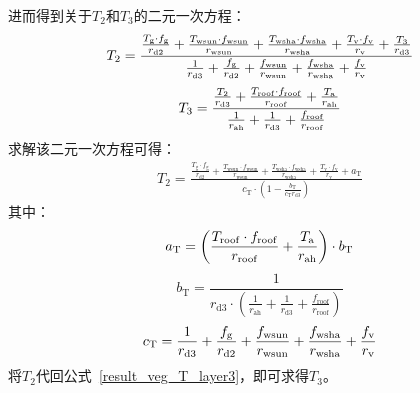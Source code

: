 进而得到关于$T_{2}$和$T_{3}$的二元一次方程：
\begin{equation}
  \begin{split}
    T_{2} =
    \frac{\frac{T_{\mathrm{g}} \cdot f_{\mathrm{g}}}{r_{\mathrm{d2}}} + \frac{T_{\mathrm{wsun}} \cdot f_{\mathrm{wsun}}}{r_{\mathrm{wsun}}} + \frac{T_{\mathrm{wsha}} \cdot f_{\mathrm{wsha}}}{r_{\mathrm{wsha}}} + \frac{T_{\mathrm{v}} \cdot f_{\rm v}}{r_{\mathrm{v}}} + \frac{T_{\mathrm{3}}}{r_{\mathrm{d3}}}}{\frac{1}{r_{\mathrm{d3}}} + \frac{f_{\mathrm{g}}}{r_{\mathrm{d2}}} + \frac{f_{\mathrm{wsun}}}{r_{\mathrm{wsun}}} + \frac{f_{\mathrm{wsha}}}{r_{\mathrm{wsha}}} + \frac{f_{\rm v}}{r_{\mathrm{v}}}}
  \end{split}
\end{equation}
%
\begin{equation}\label{result_veg_T_layer3}
  T_{3} = \frac{\frac{T_{2}}{r_{\mathrm{d3}}} + \frac{T_{\mathrm{roof}} \cdot f_{\mathrm{roof}}}{r_{\mathrm{roof}}} + \frac{T_{\rm a}}{r_{\mathrm{ah}}}}{\frac{1}{r_{\mathrm{ah}}} + \frac{1}{r_{\mathrm{d3}}} + \frac{f_{\mathrm{roof}}}{r_{\mathrm{roof}}}}
\end{equation}
求解该二元一次方程可得：
\begin{equation}
  \begin{split}
    T_{2} =
    \frac{\frac{T_{\mathrm{g}} \cdot f_{\mathrm{g}}}{r_{\mathrm{d2}}} + \frac{T_{\mathrm{wsun}} \cdot f_{\mathrm{wsun}}}{r_{\mathrm{wsun}}} + \frac{T_{\mathrm{wsha}} \cdot f_{\mathrm{wsha}}}{r_{\mathrm{wsha}}} + \frac{T_{\mathrm{v}} \cdot f_{\mathrm{v}}}{r_{\mathrm{v}}} + a_{\mathrm{T}}}{c_{\mathrm{T}} \cdot \left( 1 - \frac{b_{\mathrm {T}} }{c_{\mathrm{T}} r_{\mathrm{d3}}} \right)}
  \end{split}
\end{equation}
%
其中：
\begin{equation}
  a_{\mathrm{T}} = \left(\frac{T_{\mathrm{roof}} \cdot f_{\mathrm{roof}}}{r_{\mathrm{roof}}} + \frac{T_{\rm a}}{r_{\mathrm{ah}}}\right) \cdot b_{\mathrm{T}}
\end{equation}
%
\begin{equation}
  b_{\mathrm{T}} = \frac{1}{r_{\mathrm{d3}} \cdot \left(\frac{1}{r_{\mathrm{ah}}} + \frac{1}{r_{\mathrm{d3}}} + \frac{f_{\mathrm{roof}}}{r_{\mathrm{roof}}} \right)}
\end{equation}
%
\begin{equation}
  c_{\mathrm{T}} = \frac{1}{r_{\mathrm{d3}}} + \frac{f_{\mathrm{g}}}{r_{\mathrm{d2}}} + \frac{f_{\mathrm{wsun}}}{r_{\mathrm{wsun}}} + \frac{f_{\mathrm{wsha}}}{r_{\mathrm{wsha}}} + \frac{f_{\rm v}}{r_{\mathrm{v}}}
\end{equation}
将$T_{2}$代回公式~\eqref{result_veg_T_layer3}，即可求得$T_{3}$。

